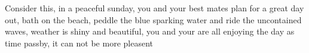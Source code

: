 Consider this, in a peaceful sunday, you and your best mates plan for a great day out, bath on the beach, peddle the blue sparking water and ride the uncontained waves, weather is shiny and beautiful, you and your are all enjoying the day as time passby, it can not be more pleasent 
